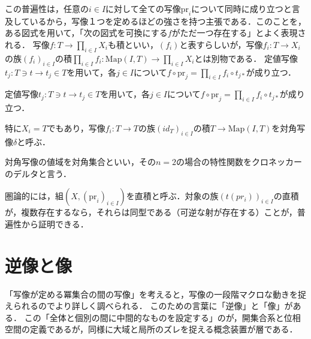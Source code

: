 \documentclass[uplatex, 12pt, dvipdfmx]{jsreport}
\begin{document}
この普遍性は，任意の$i\in I$に対して全ての写像$\mathrm{pr}_i$について同時に成り立つと言及しているから，写像１つを定めるほどの強さを持つ主張である．このことを，ある図式を用いて，「次の図式を可換にする$f$がただ一つ存在する」とよく表現される．
写像$f:T\to \prod_{i\in I}X_i$も積といい，$(f_i)$と表すらしいが，写像$f_i:T\to X_i$の族$(f_i)_{i\in I}$の積$\prod_{i\in I}f_i:\mathrm{Map}(I,T)\to\prod_{i\in I}X_i$とは別物である．
定値写像$t_j:T\ni t\to t_j\in T$を用いて，各$j\in I$について$f\circ\mathrm{pr}_j = \prod_{i\in I}f_i\circ t_{j*}$が成り立つ．
\begin{proposition}
    定値写像$t_j:T\ni t\to t_j\in T$を用いて，各$j\in I$について$f\circ\mathrm{pr}_j = \prod_{i\in I}f_i\circ t_{j*}$が成り立つ．
\end{proposition}
\begin{remark}
    特に$X_i=T$でもあり，写像$f_i:T\to T$の族$(id_T)_{i\in I}$の積$T\to\mathrm{Map}(I,T)$を対角写像$\delta$と呼ぶ．
    \begin{center}\end{center}
    対角写像の値域を対角集合といい，その$n=2$の場合の特性関数をクロネッカーのデルタと言う．
\end{remark}
圏論的には，組$(X, (\mathrm{pr}_i)_{i\in I})$を直積と呼ぶ．対象の族$(t(pr_i))_{i\in I}$の直積が，複数存在するなら，それらは同型である（可逆な射が存在する）ことが，普遍性から証明できる．

\section{逆像と像}
「写像が定める冪集合の間の写像」を考えると，写像の一段階マクロな動きを捉えられるのでより詳しく調べられる．
このための言葉に「逆像」と「像」がある．
この「全体と個別の間に中間的なものを設定する」のが，開集合系と位相空間の定義であるが，同様に大域と局所のズレを捉える概念装置が層である．
\end{document}
